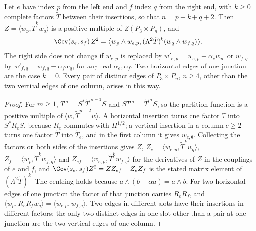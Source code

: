 \begin{lemma}\label{lem:rhobj}
Let $e$ have index $p$ from the left end and $f$ index $q$ from the right end, with $k\ge0$ complete factors $\tilde T$ between their insertions, so that
$n=p+k+q+2$. Then $Z=\langle w_p,\tilde T^kw_q\rangle$ is a positive multiple of $Z(P_3\times P_n)$, and
\[
\Cov(s_e,s_f)\,Z^2=\big\langle w_p\wedge w_{e,p},(\Lambda^2\tilde T)^k(w_q\wedge w_{f,q})\big\rangle .
\]
The right side does not change if $w_{e,p}$ is replaced by $w'_{e,p}=w_{e,p}-\alpha_ew_p$, or $w_{f,q}$ by $w'_{f,q}=w_{f,q}-\alpha_fw_q$, for any real
$\alpha_e,\alpha_f$. Two horizontal edges of one junction are the case $k=0$. Every pair of distinct edges of $P_3\times P_n$, $n\ge4$, other than the two
vertical edges of one column, arises in this way.
\end{lemma}

\begin{proof}
For $m\ge1$, $T^m=S^*\tilde T^{m-1}S$ and $ST^m=\tilde T^mS$, so the partition function is a positive multiple of $\langle w,\tilde T^{n-2}w\rangle$. A
horizontal insertion turns one factor $T$ into $S^*R_eS$, because $R_e$ commutes with $H^{1/2}$; a vertical insertion in a column $c\ge2$ turns one
factor $\tilde T$ into $\tilde T_e$, and in the first column it gives $w_{e,0}$. Collecting the factors on both sides of the insertions gives $Z$,
$Z_e=\langle w_{e,p},\tilde T^kw_q\rangle$, $Z_f=\langle w_p,\tilde T^kw_{f,q}\rangle$ and $Z_{ef}=\langle w_{e,p},\tilde T^kw_{f,q}\rangle$ for the
derivatives of $Z$ in the couplings of $e$ and $f$, and $\Cov(s_e,s_f)Z^2=ZZ_{ef}-Z_eZ_f$ is the stated matrix element of $(\Lambda^2\tilde T)^k$. The
centring holds because $a\wedge(b-\alpha a)=a\wedge b$. For two horizontal edges of one junction the factor of that junction carries
$R_eR_f$, and $\langle w_p,R_eR_fw_q\rangle=\langle w_{e,p},w_{f,q}\rangle$. Two edges in different slots have their insertions in different factors;
the only two distinct edges in one slot other than a pair at one junction are the two vertical edges of one column.
\end{proof}

